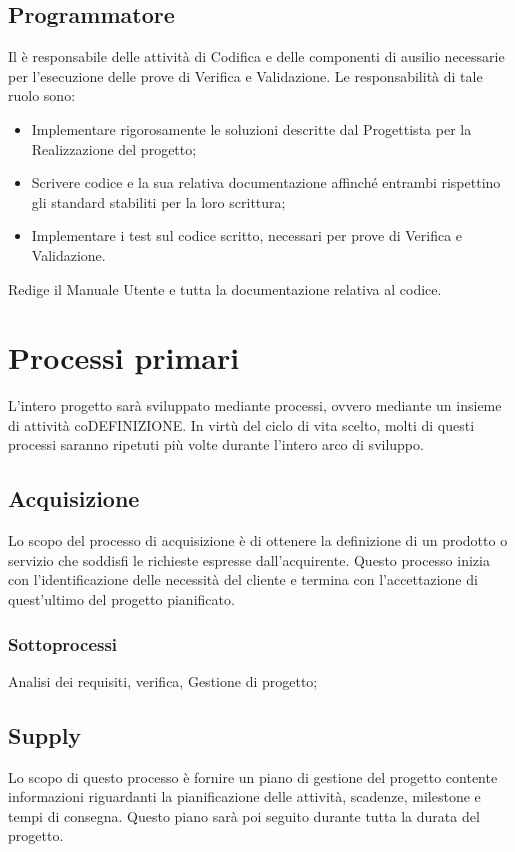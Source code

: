 \subsection{Programmatore}
\label{2.6}
Il  è responsabile delle attività di Codifica e delle componenti di ausilio
necessarie per l'esecuzione delle prove di Verifica e Validazione. Le responsabilità di tale ruolo sono:
\begin{itemize}
\item Implementare rigorosamente le soluzioni descritte dal Progettista per la Realizzazione del progetto;
\item Scrivere codice e la sua relativa documentazione affinché entrambi rispettino gli standard stabiliti per la loro scrittura;
\item Implementare i test sul codice scritto, necessari per prove di Verifica e Validazione.
\end{itemize}
Redige il Manuale Utente e tutta la documentazione relativa al codice.

\newpage
\section{Processi primari}
L'intero progetto sarà sviluppato mediante processi, ovvero mediante un insieme di attività coDEFINIZIONE.
In virtù del ciclo di vita scelto, molti di questi processi saranno ripetuti più volte durante l'intero arco di sviluppo.

\subsection{Acquisizione}
Lo scopo del processo di acquisizione è di ottenere la definizione di un prodotto o servizio che soddisfi le richieste espresse dall'acquirente.
Questo processo inizia con l'identificazione delle necessità del cliente e termina con l'accettazione di quest'ultimo del progetto pianificato.
\subsubsection{Sottoprocessi}
Analisi dei requisiti, verifica, Gestione di progetto;
\subsection{Supply}
Lo scopo di questo processo è fornire un piano di gestione del progetto contente informazioni riguardanti la pianificazione delle attività, scadenze, milestone e tempi di consegna. Questo piano sarà poi seguito durante tutta la durata del progetto.
